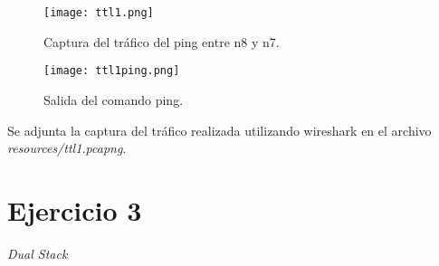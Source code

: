 \documentclass[osajnl,twocolumn,showpacs,superscriptaddress,10pt]{revtex4-1} %
\begin{document}
\begin{enumerate}[a)]
    \begin{figure}[H]
        \centering
        \texttt{[image: ttl1.png]}
        \caption{Captura del tráfico del ping entre n8 y n7.}
        \label{image:ttl1}
    \end{figure}

    \begin{figure}[H]
        \centering
        \texttt{[image: ttl1ping.png]}
        \caption{Salida del comando ping.}
        \label{image:ttl1ping}
    \end{figure}

    Se adjunta la captura del tráfico realizada utilizando wireshark en el archivo \textit{resources/ttl1.pcapng}.
\end{enumerate}

\section{Ejercicio 3}

\textit{Dual Stack}
\end{document}
